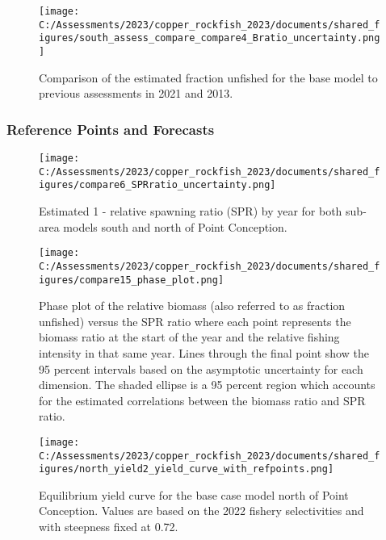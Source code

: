 \documentclass[11pt,
  english,
  letterpaper,
]{article}
\begin{document}
\newpage

\begin{figure}
\centering
\texttt{[image: C:/Assessments/2023/copper\_rockfish\_2023/documents/shared\_figures/south\_assess\_compare\_compare4\_Bratio\_uncertainty.png]}
\caption{Comparison of the estimated fraction unfished for the base model to previous assessments in 2021 and 2013.\label{fig:comp-assess-depl}}
\end{figure}

\newpage

\hypertarget{reference-points-and-forecasts}{%
\subsubsection{Reference Points and Forecasts}\label{reference-points-and-forecasts}}

\begin{figure}
\centering
\texttt{[image: C:/Assessments/2023/copper\_rockfish\_2023/documents/shared\_figures/compare6\_SPRratio\_uncertainty.png]}
\caption{Estimated 1 - relative spawning ratio (SPR) by year for both sub-area models south and north of Point Conception.\label{fig:1-spr}}
\end{figure}

\clearpage

\begin{figure}
\centering
\texttt{[image: C:/Assessments/2023/copper\_rockfish\_2023/documents/shared\_figures/compare15\_phase\_plot.png]}
\caption{Phase plot of the relative biomass (also referred to as fraction unfished) versus the SPR ratio where each point represents the biomass ratio at the start of the year and the relative fishing intensity in that same year. Lines through the final point show the 95 percent intervals based on the asymptotic uncertainty for each dimension. The shaded ellipse is a 95 percent region which accounts for the estimated correlations between the biomass ratio and SPR ratio.\label{fig:phase}}
\end{figure}

\pagebreak

\begin{figure}
\centering
\texttt{[image: C:/Assessments/2023/copper\_rockfish\_2023/documents/shared\_figures/north\_yield2\_yield\_curve\_with\_refpoints.png]}
\caption{Equilibrium yield curve for the base case model north of Point Conception. Values are based on the 2022 fishery selectivities and with steepness fixed at 0.72.\label{fig:yield-north}}
\end{figure}
\end{document}
